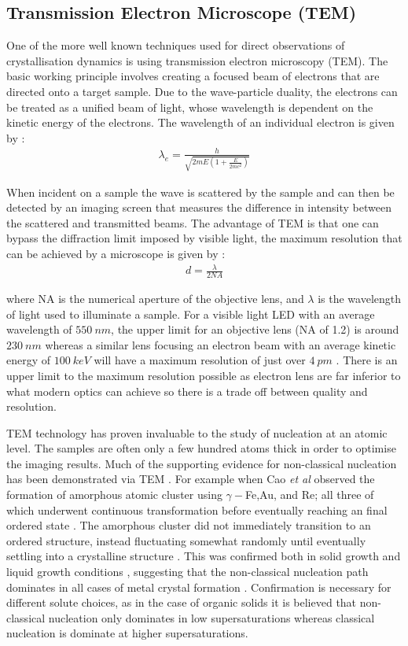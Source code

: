 \subsection{Transmission Electron Microscope (TEM)}
One of the more well known techniques used for direct observations 
of crystallisation dynamics is using transmission electron 
microscopy (TEM). The basic working principle involves creating a 
focused beam of electrons that are directed onto a target sample.
Due to the wave-particle duality, the electrons can be treated 
as a unified beam of light, whose wavelength is dependent on the 
kinetic energy of the electrons. The wavelength of an individual 
electron is given by \cite{Williams2009}:
\begin{align}
	\lambda_e = \frac{h}{\sqrt{2mE(1+\frac{E}{2mc^2})}}
\end{align}

\noindent
When incident on a sample the wave is scattered by the sample 
and can then be detected by an imaging screen that measures 
the difference in intensity between the scattered and 
transmitted beams. The advantage of TEM is that one can bypass
the diffraction limit imposed by visible light, the maximum 
resolution that can be achieved by a microscope is given by
\cite{Champness2020}:
\begin{align}
	d = \frac{\lambda}{2NA}
\end{align} 

\noindent
where NA is the numerical aperture of the objective lens, and
$\lambda$ is the wavelength of light used to illuminate a sample.
For a visible light LED with an average wavelength of $550~nm$, 
the upper limit for an objective lens (NA of 1.2) is around 
$230~nm$ whereas a similar lens focusing an electron beam 
with an average kinetic energy of $100~keV$ will have a maximum 
resolution of just over $4~pm$ \cite{Champness2020}. There is
an upper limit to the maximum resolution possible as electron 
lens are far inferior to what modern optics can achieve 
\cite{Champness2020} so there is a trade off between quality and 
resolution. 

TEM technology has proven invaluable to the study of nucleation
at an atomic level. The samples are often only a few hundred 
atoms thick in order to optimise the imaging results. Much of 
the supporting evidence for non-classical nucleation has been 
demonstrated via TEM \cite{Ye2023}. For example when Cao 
\textit{et al} observed the formation of amorphous atomic 
cluster using $\gamma-$Fe,Au, and Re; all three of which 
underwent continuous transformation before eventually 
reaching an final ordered state \cite{Cao2020}. The amorphous 
cluster did not immediately transition to an ordered structure, 
instead fluctuating somewhat randomly until eventually settling 
into a crystalline structure \cite{Cao2020}. This was confirmed 
both in solid growth and liquid growth conditions \cite{Cao2020, 
	Loh2016}, suggesting that the non-classical nucleation path 
dominates in all cases of metal crystal formation \cite{Ye2023}. 
Confirmation is necessary for different solute choices, as in 
the case of organic solids it is believed that non-classical 
nucleation only dominates in low supersaturations whereas 
classical nucleation is dominate at higher supersaturations.

